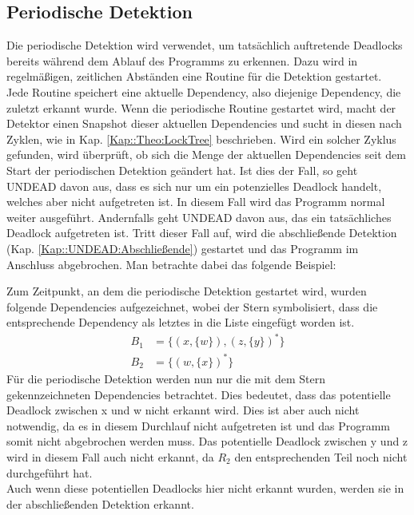 \subsection{Periodische Detektion}
Die periodische Detektion wird verwendet, um tatsächlich auftretende Deadlocks bereits während dem 
Ablauf des Programms zu erkennen. Dazu wird in regelmäßigen, zeitlichen 
Abständen eine Routine für die Detektion gestartet.\\
Jede Routine speichert eine 
aktuelle Dependency, also diejenige Dependency, die zuletzt erkannt wurde.
Wenn die periodische Routine gestartet wird, macht der Detektor einen Snapshot
dieser aktuellen Dependencies und sucht in diesen nach Zyklen, wie in Kap.
\ref{Kap::Theo:LockTree} beschrieben. Wird ein solcher Zyklus gefunden, wird 
überprüft, ob sich die Menge der aktuellen Dependencies seit dem Start der 
periodischen Detektion geändert hat. Ist dies der Fall, so geht UNDEAD davon aus,
dass es sich nur um ein potenzielles Deadlock handelt, welches aber nicht 
aufgetreten ist. In diesem Fall wird das Programm normal weiter ausgeführt.
Andernfalls geht UNDEAD davon aus, das ein tatsächliches Deadlock aufgetreten 
ist. Tritt dieser Fall auf, wird die 
abschließende Detektion (Kap. \ref{Kap::UNDEAD:Abschließende}) gestartet 
und das Programm im Anschluss abgebrochen. 
Man betrachte dabei das folgende Beispiel:
\begin{figure}[H]
    
\end{figure}
Zum Zeitpunkt, an dem die periodische Detektion gestartet wird, wurden folgende
Dependencies aufgezeichnet, wobei der Stern symbolisiert, dass die entsprechende 
Dependency als letztes in die Liste eingefügt worden ist.
\begin{align*}
    B_1 &= \{(x, \{w\}), (z, \{y\})^*\}\\
    B_2 &= \{(w, \{x\})^*\}
\end{align*}
Für die periodische Detektion werden nun nur die mit dem Stern gekennzeichneten 
Dependencies betrachtet. Dies bedeutet, dass das potentielle Deadlock zwischen 
x und w nicht erkannt wird. Dies ist aber auch nicht notwendig, da es in diesem 
Durchlauf nicht aufgetreten ist und das Programm somit nicht abgebrochen 
werden muss. Das potentielle Deadlock zwischen y und z wird in diesem Fall auch 
nicht erkannt, da $R_2$ den entsprechenden Teil noch nicht durchgeführt hat.\\
Auch wenn diese potentiellen Deadlocks hier nicht erkannt wurden, werden sie in der 
abschließenden Detektion erkannt.
